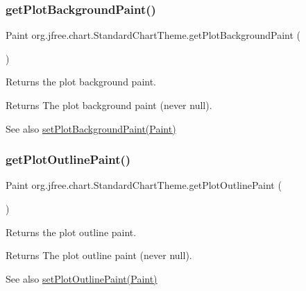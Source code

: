 \subsubsection{\texorpdfstring{get\+Plot\+Background\+Paint()}{getPlotBackgroundPaint()}}
{\footnotesize\ttfamily Paint org.\+jfree.\+chart.\+Standard\+Chart\+Theme.\+get\+Plot\+Background\+Paint (\begin{DoxyParamCaption}{ }\end{DoxyParamCaption})}

Returns the plot background paint.

\begin{DoxyReturn}{Returns}
The plot background paint (never {\ttfamily null}).
\end{DoxyReturn}
\begin{DoxySeeAlso}{See also}
\mbox{\hyperlink{classorg_1_1jfree_1_1chart_1_1_standard_chart_theme_a828da90a85a9f3cc3b592e0d588d8eb3}{set\+Plot\+Background\+Paint(\+Paint)}} 
\end{DoxySeeAlso}
\mbox{\label{classorg_1_1jfree_1_1chart_1_1_standard_chart_theme_a86705dd536633d55d7451feb16e589ee}} 
\subsubsection{\texorpdfstring{get\+Plot\+Outline\+Paint()}{getPlotOutlinePaint()}}
{\footnotesize\ttfamily Paint org.\+jfree.\+chart.\+Standard\+Chart\+Theme.\+get\+Plot\+Outline\+Paint (\begin{DoxyParamCaption}{ }\end{DoxyParamCaption})}

Returns the plot outline paint.

\begin{DoxyReturn}{Returns}
The plot outline paint (never {\ttfamily null}).
\end{DoxyReturn}
\begin{DoxySeeAlso}{See also}
\mbox{\hyperlink{classorg_1_1jfree_1_1chart_1_1_standard_chart_theme_abb2cb7117ac0684e201aa370e1589332}{set\+Plot\+Outline\+Paint(\+Paint)}} 
\end{DoxySeeAlso}
\mbox{\label{classorg_1_1jfree_1_1chart_1_1_standard_chart_theme_a8f0db366a4b79b42137e65498d23e41f}} 
